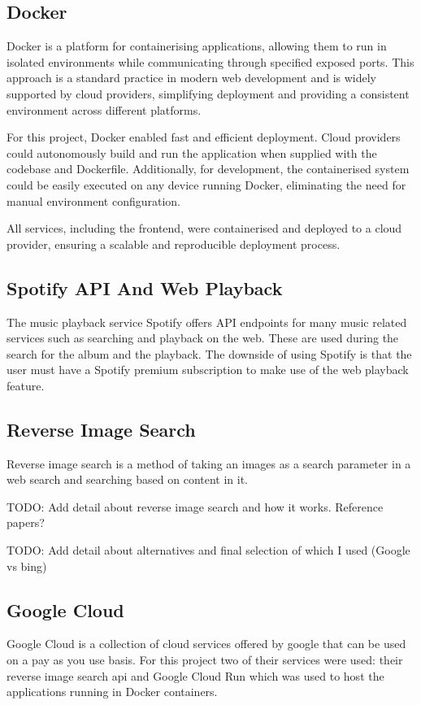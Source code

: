 \subsection{Docker}
Docker is a platform for containerising applications, allowing them to run in isolated environments while communicating through specified exposed ports. This approach is a standard practice in modern web development and is widely supported by cloud providers, simplifying deployment and providing a consistent environment across different platforms.

For this project, Docker enabled fast and efficient deployment. Cloud providers could autonomously build and run the application when supplied with the codebase and Dockerfile. Additionally, for development, the containerised system could be easily executed on any device running Docker, eliminating the need for manual environment configuration.

All services, including the frontend, were containerised and deployed to a cloud provider, ensuring a scalable and reproducible deployment process.

\subsection{Spotify API And Web Playback}
The music playback service Spotify offers API endpoints for many music related services such as searching and playback on the web. These are used during the search for the album and the playback. The downside of using Spotify is that the user must have a Spotify premium subscription to make use of the web playback feature.

\subsection{Reverse Image Search}
Reverse image search is a method of taking an images as a search parameter in a web search and searching based on content in it.

TODO: Add detail about reverse image search and how it works. Reference papers?

TODO: Add detail about alternatives and final selection of which I used (Google vs bing)

\subsection{Google Cloud}
Google Cloud is a collection of cloud services offered by google that can be used on a pay as you use basis. For this project two of their services were used: their reverse image search api and Google Cloud Run which was used to host the applications running in Docker containers.

